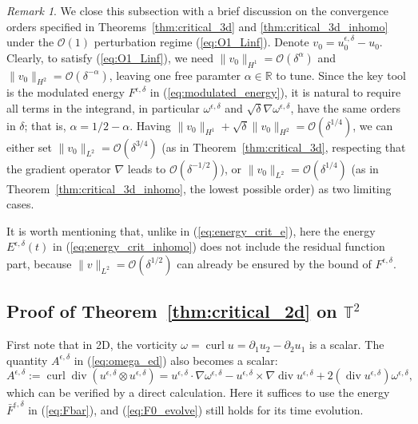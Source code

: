 \documentclass[reqno,10pt]{amsart}
\theoremstyle{definition}
\theoremstyle{remark}
\newtheorem{remark}[theorem]{Remark}
\numberwithin{equation}{section}
\DeclareMathOperator{\dive}{div}
\DeclareMathOperator{\curl}{curl}
\begin{document}
\begin{remark} \label{rem:orders}
We close this subsection with a brief discussion on the convergence orders specified in Theorems~\ref{thm:critical_3d} and \ref{thm:critical_3d_inhomo} under the $\mathcal O(1)$ perturbation regime (\ref{eq:O1_Linf}). Denote $v_0=u^{\epsilon,\delta}_0-u_0$. Clearly, to satisfy (\ref{eq:O1_Linf}), we need $\|v_0\|_{H^1}=\mathcal O(\delta^\alpha)$ and $\|v_0\|_{H^2}=\mathcal O(\delta^{-\alpha})$, leaving one free paramter $\alpha\in\mathbb R$ to tune. Since the key tool is the modulated energy $F^{\epsilon,\delta}$ in (\ref{eq:modulated_energy}), it is natural to require all terms in the integrand, in particular $\omega^{\epsilon,\delta}$ and $\sqrt\delta \nabla\omega^{\epsilon,\delta}$, have the same orders in $\delta$; that is, $\alpha = 1/2-\alpha$. Having $\|v_0\|_{H^1}+\sqrt\delta\|v_0\|_{H^2}=\mathcal O(\delta^{1/4})$, we can either set $\|v_0\|_{L^2}=\mathcal O(\delta^{3/4})$ (as in Theorem~\ref{thm:critical_3d}, respecting that the gradient operator $\nabla$ leads to $\mathcal O(\delta^{-1/2})$), or $\|v_0\|_{L^2}=\mathcal O(\delta^{1/4})$ (as in Theorem~\ref{thm:critical_3d_inhomo}, the lowest possible order) as two limiting cases.

It is worth mentioning that, unlike in (\ref{eq:energy_crit_e}), here the energy $E^{\epsilon,\delta}(t)$ in (\ref{eq:energy_crit_inhomo}) does not include the residual function part, because $\|v\|_{L^2}=\mathcal O(\delta^{1/2})$ can already be ensured by the bound of $F^{\epsilon,\delta}$. 
\end{remark}

\subsection{Proof of Theorem~\ref{thm:critical_2d} on $\mathbb T^2$} \label{subsec:thm:critical_2d}

First note that in 2D, the vorticity $\omega=\curl u=\partial_1u_2-\partial_2u_1$ is a scalar. The quantity $A^{\epsilon,\delta}$ in (\ref{eq:omega_ed}) also becomes a scalar:
\begin{equation} \label{eq:A_2d}
    A^{\epsilon,\delta}:=\curl \dive (u^{\epsilon,\delta}\otimes u^{\epsilon,\delta}) = u^{\epsilon,\delta}\cdot \nabla \omega^{\epsilon,\delta}-u^{\epsilon,\delta}\times \nabla \dive u^{\epsilon,\delta} + 2(\dive u^{\epsilon,\delta}) \omega^{\epsilon,\delta},
\end{equation}
which can be verified by a direct calculation. Here it suffices to use the energy $\bar F^{\epsilon,\delta}$ in (\ref{eq:Fbar}), and (\ref{eq:F0_evolve}) still holds for its time evolution.
\end{document}
